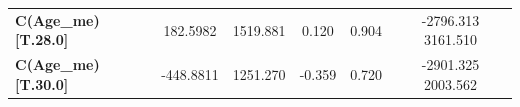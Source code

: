 \begin{subappendices}
\begin{table}[H]
{\begin{tabular}{lccccc}
\textbf{C(Age_me)[T.28.0]}                                           &     182.5982  &     1519.881     &     0.120  &         0.904        &     -2796.313  3161.510       \\
\textbf{C(Age_me)[T.30.0]}                                           &    -448.8811  &     1251.270     &    -0.359  &         0.720        &     -2901.325  2003.562       \\

\end{tabular}}
\end{table}
\end{subappendices}

